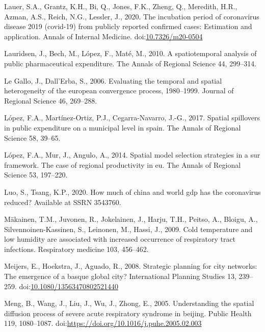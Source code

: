 \documentclass[]{elsarticle} %
\begin{document}
\leavevmode\hypertarget{ref-Lauer2020incubation}{}%
Lauer, S.A., Grantz, K.H., Bi, Q., Jones, F.K., Zheng, Q., Meredith,
H.R., Azman, A.S., Reich, N.G., Lessler, J., 2020. The incubation period
of coronavirus disease 2019 (covid-19) from publicly reported confirmed
cases: Estimation and application. Annals of Internal Medicine.
doi:\href{https://doi.org/10.7326/m20-0504}{10.7326/m20-0504}

\leavevmode\hypertarget{ref-Lauridsen2010spatiotemporal}{}%
Lauridsen, J., Bech, M., López, F., Maté, M., 2010. A spatiotemporal
analysis of public pharmaceutical expenditure. The Annals of Regional
Science 44, 299--314.

\leavevmode\hypertarget{ref-Legallo2006evaluating}{}%
Le Gallo, J., Dall'Erba, S., 2006. Evaluating the temporal and spatial
heterogeneity of the european convergence process, 1980--1999. Journal
of Regional Science 46, 269--288.

\leavevmode\hypertarget{ref-Lopez2017spatial}{}%
López, F.A., Martínez-Ortiz, P.J., Cegarra-Navarro, J.-G., 2017. Spatial
spillovers in public expenditure on a municipal level in spain. The
Annals of Regional Science 58, 39--65.

\leavevmode\hypertarget{ref-Lopez2014spatial}{}%
López, F.A., Mur, J., Angulo, A., 2014. Spatial model selection
strategies in a sur framework. The case of regional productivity in eu.
The Annals of Regional Science 53, 197--220.

\leavevmode\hypertarget{ref-Luo2020how}{}%
Luo, S., Tsang, K.P., 2020. How much of china and world gdp has the
coronavirus reduced? Available at SSRN 3543760.

\leavevmode\hypertarget{ref-Makinen2009cold}{}%
Mäkainen, T.M., Juvonen, R., Jokelainen, J., Harju, T.H., Peitso, A.,
Bloigu, A., Silvennoinen-Kassinen, S., Leinonen, M., Hassi, J., 2009.
Cold temperature and low humidity are associated with increased
occurrence of respiratory tract infections. Respiratory medicine 103,
456--462.

\leavevmode\hypertarget{ref-Meijers2008strategic}{}%
Meijers, E., Hoekstra, J., Aguado, R., 2008. Strategic planning for city
networks: The emergence of a basque global city? International Planning
Studies 13, 239--259.
doi:\href{https://doi.org/10.1080/13563470802521440}{10.1080/13563470802521440}

\leavevmode\hypertarget{ref-Meng2005understanding}{}%
Meng, B., Wang, J., Liu, J., Wu, J., Zhong, E., 2005. Understanding the
spatial diffusion process of severe acute respiratory syndrome in
beijing. Public Health 119, 1080--1087.
doi:\href{https://doi.org/https://doi.org/10.1016/j.puhe.2005.02.003}{https://doi.org/10.1016/j.puhe.2005.02.003}
\end{document}
